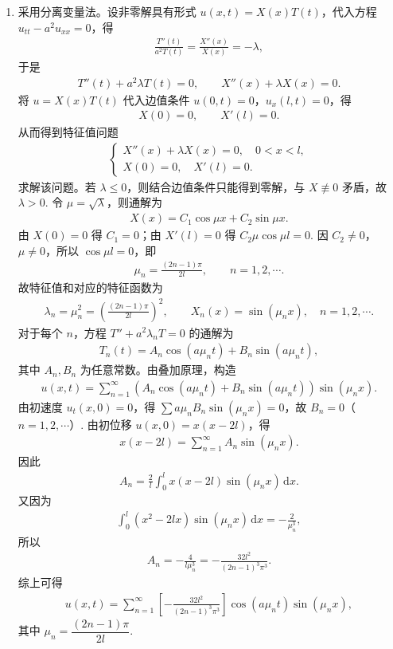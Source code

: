 \documentclass[../../main.tex]{subfiles}%
\begin{document}
\begin{solution}
\begin{enumerate}[(1)]
\item 采用分离变量法。设非零解具有形式 $u(x,t)=X(x)T(t)$，代入方程 $u_{tt}-a^2u_{xx}=0$，得
\begin{align*}
\frac{T''(t)}{a^2T(t)}=\frac{X''(x)}{X(x)}=-\lambda,
\end{align*}
于是
\begin{align*}
T''(t)+a^2\lambda T(t)=0,\qquad X''(x)+\lambda X(x)=0.
\end{align*}
将 $u=X(x)T(t)$ 代入边值条件 $u(0,t)=0$，$u_x(l,t)=0$，得
\begin{align*}
X(0)=0,\qquad X'(l)=0.
\end{align*}
从而得到特征值问题
\begin{align*}
\begin{cases}
X''(x)+\lambda X(x)=0,\quad 0<x<l,\\
X(0)=0,\quad X'(l)=0.
\end{cases}
\end{align*}
求解该问题。若 $\lambda\leqslant 0$，则结合边值条件只能得到零解，与 $X\not\equiv 0$ 矛盾，故 $\lambda>0$. 令 $\mu=\sqrt{\lambda}$，则通解为
\begin{align*}
X(x)=C_1\cos \mu x+C_2\sin \mu x.
\end{align*}
由 $X(0)=0$ 得 $C_1=0$；由 $X'(l)=0$ 得 $C_2\mu\cos \mu l=0$. 因 $C_2\neq 0$，$\mu\neq 0$，所以 $\cos \mu l=0$，即
\begin{align*}
\mu_n=\frac{(2n-1)\pi}{2l},\qquad n=1,2,\cdots.
\end{align*}
故特征值和对应的特征函数为
\begin{align*}
\lambda_n=\mu_n^2=\left(\frac{(2n-1)\pi}{2l}\right)^2,\qquad X_n(x)=\sin(\mu_n x),\quad n=1,2,\cdots.
\end{align*}
对于每个 $n$，方程 $T''+a^2\lambda_n T=0$ 的通解为
\begin{align*}
T_n(t)=A_n\cos(a\mu_n t)+B_n\sin(a\mu_n t),
\end{align*}
其中 $A_n,B_n$ 为任意常数。由叠加原理，构造
\begin{align*}
u(x,t)=\sum_{n=1}^{\infty}\left(A_n\cos(a\mu_n t)+B_n\sin(a\mu_n t)\right)\sin(\mu_n x).
\end{align*}
由初速度 $u_t(x,0)=0$，得 $\sum a\mu_n B_n\sin(\mu_n x)=0$，故 $B_n=0$（$n=1,2,\cdots$）.
由初位移 $u(x,0)=x(x-2l)$，得
\begin{align*}
x(x-2l)=\sum_{n=1}^{\infty}A_n\sin(\mu_n x).
\end{align*}
因此
\begin{align*}
A_n=\frac{2}{l}\int_0^l x(x-2l)\sin(\mu_n x)\,\mathrm{d}x.
\end{align*}
又因为
\begin{align*}
\int_0^l (x^2-2lx)\sin(\mu_n x)\,\mathrm{d}x=-\frac{2}{\mu_n^3},
\end{align*}
所以
\begin{align*}
A_n=-\frac{4}{l\mu_n^3}=-\frac{32l^2}{(2n-1)^3\pi^3}.
\end{align*}
综上可得
\begin{align*}
u(x,t)=\sum_{n=1}^{\infty}\left[-\frac{32l^2}{(2n-1)^3\pi^3}\right]\cos(a\mu_n t)\sin(\mu_n x),
\end{align*}
其中 $\mu_n=\dfrac{(2n-1)\pi}{2l}$.


\end{enumerate}
\end{solution}
\end{document}
